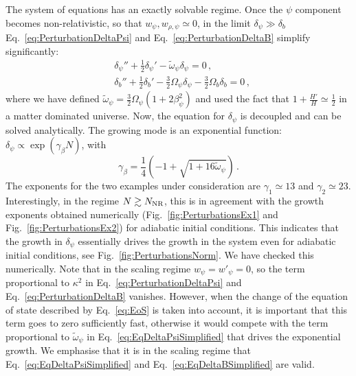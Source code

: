 \documentclass[a4paper, amsfonts, amssymb, amsmath, reprint, showkeys, nofootinbib, twoside, superscriptaddress]{revtex4-1}
\begin{document}
The system of equations has an exactly solvable regime. Once the $\psi$ component becomes non-relativistic, so that $w_\psi, w_{\rho, \psi} \simeq 0$, in the limit $\delta_{\psi} \gg \delta_b$ Eq.~\eqref{eq:PerturbationDeltaPsi} and Eq.~\eqref{eq:PerturbationDeltaB} simplify significantly:
%
\begin{align}
\label{eq:EqDeltaPsiSimplified}
&\delta_\psi'' + \frac{1}{2} \delta_\psi' - \tilde{\omega}_{\psi} \delta_\psi = 0 \,, \\
\label{eq:EqDeltaBSimplified}
&\delta_b'' + \frac{1}{2} \delta_b' - \frac{3}{2} \Omega_\psi \delta_\psi - \frac{3}{2} \Omega_b \delta_b = 0 \,,
\end{align}
%
where we have defined $\tilde{\omega}_\psi = \frac{3}{2} \Omega_\psi (1 + 2 \beta_\psi^2)$ and used the fact that $1 + \frac{H'}{H} \simeq \frac{1}{2}$ in a matter dominated universe.
Now, the equation for $\delta_\psi$ is decoupled and can be solved analytically. The growing mode is an exponential function: $\delta_\psi \propto \exp\left(\gamma_\beta N\right)$, with
\begin{equation}
\label{eq:Exponent}
\gamma_\beta = \frac{1}{4} \left(-1 + \sqrt{1 + 16 \tilde{\omega}_\psi}\right) \,.
\end{equation}
%
The exponents for the two examples under consideration are $\gamma_1 \simeq 13$ and $\gamma_2 \simeq 23$. Interestingly, in the regime $N \gtrsim N_{\rm NR}$, this is in agreement with the growth exponents obtained numerically (Fig.~\ref{fig:PerturbationsEx1} and Fig.~\ref{fig:PerturbationsEx2}) for adiabatic initial conditions. This indicates that the growth in $\delta_{\psi}$ essentially drives the growth in the system even for adiabatic initial conditions, see Fig.~\ref{fig:PerturbationsNorm}. We have checked this numerically. Note that in the scaling regime $w_\psi = w'_\psi = 0$, so the term proportional to $\kappa^2$ in Eq.~\eqref{eq:PerturbationDeltaPsi} and Eq.~\eqref{eq:PerturbationDeltaB} vanishes. However, when the change of the equation of state described by Eq.~\eqref{eq:EoS} is taken into account, it is important that this term goes to zero sufficiently fast, otherwise it would compete with the term proportional to $\tilde{\omega}_\psi$ in Eq.~\eqref{eq:EqDeltaPsiSimplified} that drives the exponential growth. We emphasise that it is in the scaling regime that Eq.~\eqref{eq:EqDeltaPsiSimplified} and Eq.~\eqref{eq:EqDeltaBSimplified} are valid.
\end{document}
